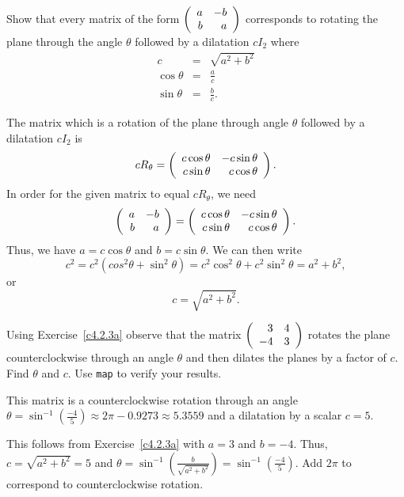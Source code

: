 \documentclass{ximera}
\begin{document}
\begin{exercise}	\label{c4.2.3a}
Show that every matrix of the form $\left(\begin{array}{rr} a & -b\\ b &a\end{array}\right)$ corresponds to
rotating the plane through the angle $\theta$ followed by a dilatation 
$cI_2$ where
\begin{eqnarray*}
c & = & \sqrt{a^2+b^2}\\
\cos\theta & = & \frac{a}{c} \\
\sin\theta & = & \frac{b}{c}.
\end{eqnarray*}

\begin{solution}
The matrix which is a rotation of the plane 
through angle $\theta$ followed by a dilatation $cI_2$ is
\[
cR_\theta =
\left(\begin{array}{rr} c\cos\theta & -c\sin\theta\\ c\sin\theta &c\cos\theta\end{array}\right).
\]
In order for the given matrix to equal $cR_\theta$, we need
\[
\left(\begin{array}{rr} a & -b\\ b &a\end{array}\right) =
\left(\begin{array}{rr} c\cos\theta & -c\sin\theta\\ c\sin\theta &c\cos\theta\end{array}\right).
\]
Thus, we have $a = c\cos\theta$ and $b = c\sin\theta$.  We can then write
\[
c^2 = c^2(cos^2\theta + \sin^2\theta) = c^2\cos^2\theta + c^2\sin^2\theta
= a^2 + b^2,
\]
or
\[
c = \sqrt{a^2 + b^2}.
\]

\end{solution}
\end{exercise}

\begin{exercise}  \label{c4.2.3b}
Using Exercise~\ref{c4.2.3a} observe that the matrix
$\left(\begin{array}{rr} 3 & 4\\ -4 &3\end{array}\right)$ rotates the plane counterclockwise through
an angle $\theta$ and then dilates the planes by a factor of $c$.
Find $\theta$ and $c$.  Use {\tt map} to verify your results.

\begin{solution}
\ans This matrix is a counterclockwise rotation through an 
angle $\theta = \sin^{-1}\left(\frac{-4}{5}\right) \approx 2\pi-0.9273
\approx 5.3559$ and a dilatation by a scalar $c = 5$.

\soln This follows from Exercise~\ref{c4.2.3a} with $a = 3$
and $b = -4$.  Thus, $c = \sqrt{a^2 + b^2} = 5$ and
$\theta = \sin^{-1}\left(\frac{b}{\sqrt{a^2 + b^2}}\right) = 
\sin^{-1}\left(\frac{-4}{5}\right)$.  Add $2\pi$ to correspond to counterclockwise rotation.

\end{solution}
\end{exercise}


\CEXER
\end{document}
